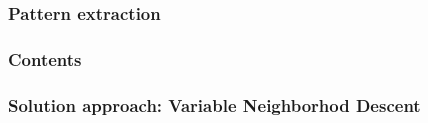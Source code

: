\begin{frame}
\frametitle{\textbf{Pattern extraction}}
\end{frame}

\begin{frame}
\frametitle{\textbf{Contents}}
  \begin{block}{\textbf{\thirdtitleF}}
  \end{block}  

  \begin{block}{\textbf{\thirdtitleS}}
  \end{block}  
\end{frame}

\begin{frame}
\frametitle{\textbf{Solution approach: Variable Neighborhod Descent}}
  \pause
  \begin{adjustbox}{max totalsize={0.8\textwidth}{0.8\textheight},center}
    
  \end{adjustbox}

\end{frame}


